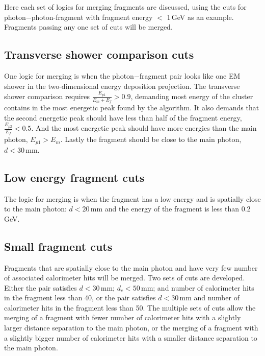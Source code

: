Here each set of logics for merging fragments are discussed, using the cuts for photon$-$photon-fragment with fragment energy $<$ 1\,GeV as an example. Fragments passing any one set of cuts will be merged.



\subsection{Transverse shower comparison cuts}

One logic for merging is when the photon$-$fragment pair looks like one EM shower in the two-dimensional energy deposition projection. The transverse shower comparison requires $\frac{E_{p1}}{E_m + E_f} > 0.9 $, demanding  most energy of the cluster contains in the most energetic peak found by the  \peakFinding algorithm. It also demands that the second energetic peak should have less than half of the fragment energy,  $\frac{E_{p2}}{E_f} < 0.5 $. And the most energetic peak should have more energies than the main photon,   $E_{p1} > E_m$. Lastly the fragment should be close to the main photon, $d < 30 $\,mm.




\subsection{Low energy fragment cuts}

The logic for merging  is when the fragment has a low energy and is spatially close to the main photon: $d < 20 $\,mm and the energy of the fragment is less than 0.2\,GeV.

 \subsection{Small fragment cuts}

Fragments that are spatially close to the main photon and have very few number of associated calorimeter hits will be merged.  Two sets of cuts are developed. Either the pair satisfies  $d < 30 $\,mm; $d_c < 50 $\,mm; and number of calorimeter hits in the fragment less than 40, or the pair satisfies $d < 30 $\,mm and number of calorimeter hits in the fragment less than 50. The multiple sets of cuts allow the merging of a fragment with fewer number of  calorimeter hits with a slightly larger distance separation to the main photon, or the merging of a fragment with a slightly bigger number of  calorimeter hits with a smaller distance separation to the main photon.

